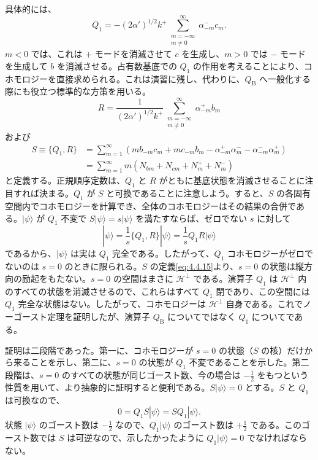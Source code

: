 具体的には、
\begin{equation}
Q_1=-(2\alpha')^{1/2}k^+
\sum_{\substack{m=-\infty\\m\neq0}}^\infty\alpha^-_{-m}c_m.
\tag{4.4.13}\label{eq:4.4.13}
\end{equation}
$m<0$ では、これは $+$ モードを消滅させて $c$ を生成し、$m>0$ では $-$ モードを生成して $b$ を消滅させる。占有数基底での $Q_1$ の作用を考えることにより、コホモロジーを直接求められる。これは演習に残し、代わりに、$Q_{\mathrm B}$ へ一般化する際にも役立つ標準的な方策を用いる。
\begin{equation}
R=\frac1{(2\alpha')^{1/2}k^+}
\sum_{\substack{m=-\infty\\m\neq0}}^\infty\alpha^+_{-m}b_m
\tag{4.4.14}\label{eq:4.4.14}
\end{equation}
および
\begin{equation}
\begin{aligned}
S\equiv\{Q_1,R\}
&=\sum_{m=1}^{\infty}
\left(mb_{-m}c_m+mc_{-m}b_m-\alpha^+_{-m}\alpha^-_m-\alpha^-_{-m}\alpha^+_m\right)\\
&=\sum_{m=1}^{\infty}m(N_{bm}+N_{cm}+N^+_m+N^-_m)
\end{aligned}
\tag{4.4.15}\label{eq:4.4.15}
\end{equation}
と定義する。正規順序定数は、$Q_1$ と $R$ がともに基底状態を消滅させることに注目すれば決まる。$Q_1$ が $S$ と可換であることに注意しよう。すると、$S$ の各固有空間内でコホモロジーを計算でき、全体のコホモロジーはその結果の合併である。$|\psi\rangle$ が $Q_1$ 不変で $S|\psi\rangle=s|\psi\rangle$ を満たすならば、ゼロでない $s$ に対して
\begin{equation}
|\psi\rangle=\frac1s\{Q_1,R\}|\psi\rangle
=\frac1sQ_1R|\psi\rangle
\tag{4.4.16}\label{eq:4.4.16}
\end{equation}
であるから、$|\psi\rangle$ は実は $Q_1$ 完全である。したがって、$Q_1$ コホモロジーがゼロでないのは $s=0$ のときに限られる。$S$ の定義\eqref{eq:4.4.15}より、$s=0$ の状態は縦方向の励起をもたない。$s=0$ の空間はまさに $\mathcal H^\perp$ である。演算子 $Q_1$ は $\mathcal H^\perp$ 内のすべての状態を消滅させるので、これらはすべて $Q_1$ 閉であり、この空間には $Q_1$ 完全な状態はない。したがって、コホモロジーは $\mathcal H^\perp$ 自身である。これでノーゴースト定理を証明したが、演算子 $Q_{\mathrm B}$ についてではなく $Q_1$ についてである。

証明は二段階であった。第一に、コホモロジーが $s=0$ の状態（$S$ の核）だけから来ることを示し、第二に、$s=0$ の状態が $Q_1$ 不変であることを示した。第二段階は、$s=0$ のすべての状態が同じゴースト数、今の場合は $-\tfrac12$ をもつという性質を用いて、より抽象的に証明すると便利である。$S|\psi\rangle=0$ とする。$S$ と $Q_1$ は可換なので、
\begin{equation}
0=Q_1S|\psi\rangle=SQ_1|\psi\rangle .
\tag{4.4.17}\label{eq:4.4.17}
\end{equation}
状態 $|\psi\rangle$ のゴースト数は $-\tfrac12$ なので、$Q_1|\psi\rangle$ のゴースト数は $+\tfrac12$ である。このゴースト数では $S$ は可逆なので、示したかったように $Q_1|\psi\rangle=0$ でなければならない。


